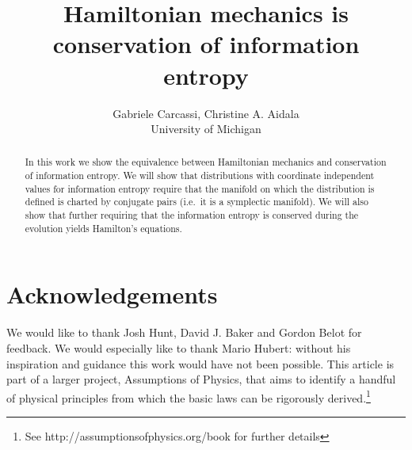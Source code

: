 \documentclass[11pt]{article}
\begin{document}
\title{Hamiltonian mechanics is conservation of information entropy}
\author{Gabriele Carcassi, Christine A. Aidala \\ University of Michigan}

\maketitle

\begin{abstract}
	In this work we show the equivalence between Hamiltonian mechanics and conservation of information entropy. We will show that distributions with coordinate independent values for information entropy require that the manifold on which the distribution is defined is charted by conjugate pairs (i.e.~it is a symplectic manifold). We will also show that further requiring that the information entropy is conserved during the evolution yields Hamilton's equations.
\end{abstract}


\section*{Acknowledgements}

We would like to thank Josh Hunt, David J. Baker and Gordon Belot for feedback. We would especially like to thank Mario Hubert: without his inspiration and guidance this work would have not been possible. This article is part of a larger project, Assumptions of Physics, that aims to identify a handful of physical principles from which the basic laws can be rigorously derived.\footnote{See http://assumptionsofphysics.org/book for further details}
\end{document}
